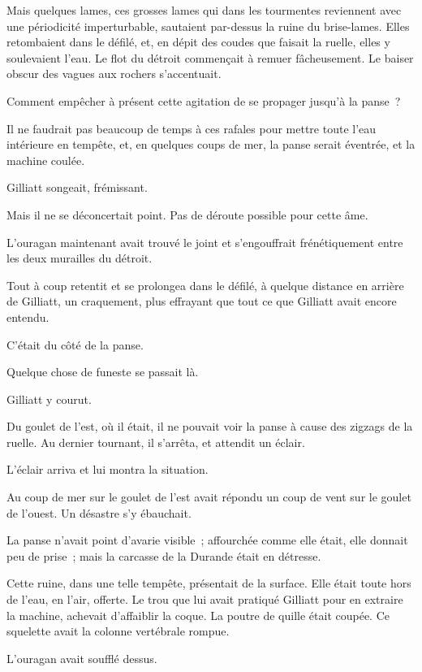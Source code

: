 \documentclass[french,twoside]{book} %
\begin{document}
Mais quelques lames, ces grosses lames qui dans  les tourmentes reviennent avec une périodicité imperturbable, sautaient par-dessus la ruine du brise-lames. Elles retombaient dans le défilé, et, en dépit des coudes que faisait la ruelle, elles y soulevaient l’eau. Le flot du détroit commençait à remuer fâcheusement. Le baiser obscur des vagues aux rochers s’accentuait.\par
Comment empêcher à présent cette agitation de se propager jusqu’à la panse ?\par
Il ne faudrait pas beaucoup de temps à ces rafales pour mettre toute l’eau intérieure en tempête, et, en quelques coups de mer, la panse serait éventrée, et la machine coulée.\par
Gilliatt songeait, frémissant.\par
Mais il ne se déconcertait point. Pas de déroute possible pour cette âme.\par
L’ouragan maintenant avait trouvé le joint et s’engouffrait frénétiquement entre les deux murailles du détroit.\par
Tout à coup retentit et se prolongea dans le défilé, à quelque distance en arrière de Gilliatt, un craquement, plus effrayant que tout ce que Gilliatt avait encore entendu.\par
C’était du côté de la panse.\par
Quelque chose de funeste se passait là.\par
Gilliatt y courut.\par
Du goulet de l’est, où il était, il ne pouvait voir la panse à cause des zigzags de la ruelle. Au dernier tournant, il s’arrêta, et attendit un éclair.\par
L’éclair arriva et lui montra la situation.\par
Au coup de mer sur le goulet de l’est avait répondu  un coup de vent sur le goulet de l’ouest. Un désastre s’y ébauchait.\par
La panse n’avait point d’avarie visible ; affourchée comme elle était, elle donnait peu de prise ; mais la carcasse de la Durande était en détresse.\par
Cette ruine, dans une telle tempête, présentait de la surface. Elle était toute hors de l’eau, en l’air, offerte. Le trou que lui avait pratiqué Gilliatt pour en extraire la machine, achevait d’affaiblir la coque. La poutre de quille était coupée. Ce squelette avait la colonne vertébrale rompue.\par
L’ouragan avait soufflé dessus.\par
\end{document}
